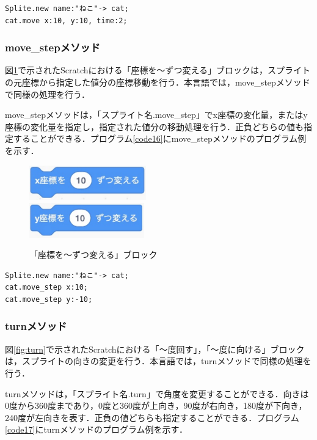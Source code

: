 \documentclass[10pt,a4j]{ltjsarticle}
\begin{document}
\begin{lstlisting}[caption=moveメソッドのプログラム例, label=code15]
Splite.new name:"ねこ"-> cat;
cat.move x:10, y:10, time:2; 
\end{lstlisting}

\subsubsection{move\_stepメソッド}
図\ref{fig:step}で示されたScratchにおける「座標を〜ずつ変える」ブロックは，スプライトの元座標から指定した値分の座標移動を行う．本言語では，move\_stepメソッドで同様の処理を行う．

move\_stepメソッドは，「スプライト名.move\_step」でx座標の変化量，またはy座標の変化量を指定し，指定された値分の移動処理を行う．正負どちらの値も指定することができる．プログラム\ref{code16}にmove\_stepメソッドのプログラム例を示す．

\begin{figure}[H]
  \centering
  \includegraphics[height=15mm]{images/step_x.pdf} \\
  \includegraphics[height=15mm]{images/step_y.pdf} 
  \caption{「座標を〜ずつ変える」ブロック}
  \label{fig:step}
\end{figure}

\begin{lstlisting}[caption=move\_stepメソッドのプログラム例, label=code16]
Splite.new name:"ねこ"-> cat;
cat.move_step x:10; 
cat.move_step y:-10; 
\end{lstlisting}

\subsubsection{turnメソッド}
図\ref{fig:turn}で示されたScratchにおける「〜度回す」，「〜度に向ける」ブロックは，スプライトの向きの変更を行う．本言語では，turnメソッドで同様の処理を行う．

turnメソッドは，「スプライト名.turn」で角度を変更することができる．向きは0度から360度まであり，0度と360度が上向き，90度が右向き，180度が下向き，240度が左向きを表す．正負の値どちらも指定することができる．プログラム\ref{code17}にturnメソッドのプログラム例を示す．
\end{document}
